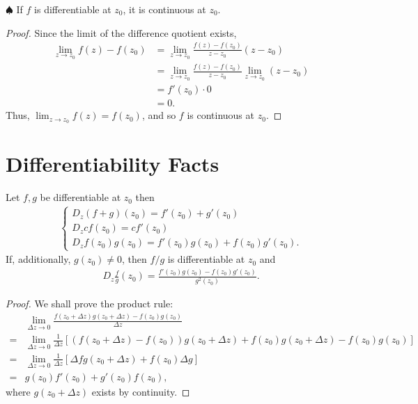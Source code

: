 \documentclass{article}
\theoremstyle{definition}
\newcommand{\f}[2]{\frac{#1}{#2}}
\newcommand{\lb}{\left[}
\newcommand{\rb}{\right]}
\newcommand{\nn}{\nonumber}
\begin{document}
\noindent $\spadesuit$ If $f$ is differentiable at $z_0$, it is continuous at $z_0$. 

\begin{proof}
	Since the limit of the difference quotient exists,
	\begin{align}
	\lim_{z\to z_0} f(z) - f(z_0) &= \lim_{z\to z_0}\f{f(z) - f(z_0)}{z - z_0}(z- z_0)\nn\\
	&= \lim_{z\to z_0} \f{f(z) - f(z_0)}{z - z_0}\lim_{z \to z_0}(z - z_0)\nn\\
	&= f'(z_0)\cdot 0\nn\\
	&= 0.
	\end{align}
	Thus, $\lim_{z\to z_0} f(z) = f(z_0)$, and so $f$ is continuous at $z_0$. 
\end{proof}


\section{Differentiability Facts}

Let $f,g$ be differentiable at $z_0$ then 
\begin{align}
\begin{cases}
D_z (f+g)(z_0) = f'(z_0) + g'(z_0)\nn\\
D_z cf(z_0) = cf'(z_0)\nn\\
D_z f(z_0)g(z_0) = f'(z_0)g(z_0) + f(z_0)g'(z_0).
\end{cases}
\end{align}
If, additionally, $g(z_0) \neq 0$, then $f/g$ is differentiable at $z_0$ and
\begin{align}
D_z \f{f}{g}(z_0) = \f{f'(z_0)g(z_0) - f(z_0) g'(z_0)}{g^2(z_0)}.
\end{align}

\begin{proof}
	We shall prove the product rule:
	\begin{align}
	&\lim_{\Delta z \to 0} \f{f(z_0 + \Delta z)g(z_0 + \Delta z) - f(z_0)g(z_0)}{\Delta z}\nn\\
	= &\lim_{\Delta z \to 0}\f{1}{\Delta z}\lb (f(z_0 + \Delta z) - f(z_0) )g(z_0 + \Delta z) + f(z_0)g(z_0 + \Delta z) - f(z_0)g(z_0) \rb\nn\\
	= &\lim_{\Delta z \to 0}\f{1}{\Delta z} \lb \Delta f g(z_0 + \Delta z) + f(z_0)\Delta g \rb\nn\\
	= &g(z_0)f'(z_0) + g'(z_0)f(z_0),
	\end{align}
	where $g(z_0 + \Delta z)$ exists by continuity. 
\end{proof}
\end{document}
